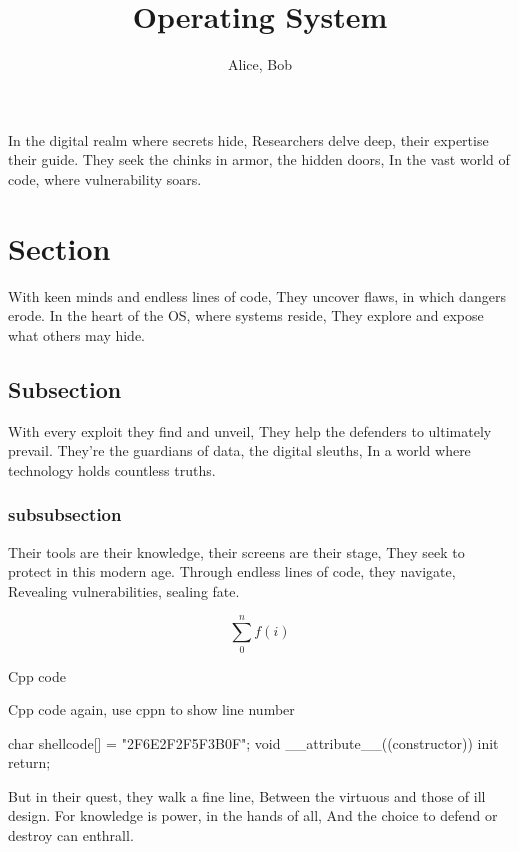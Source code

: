 \documentclass[english]{assignmentreport}
\title{Operating System}
\author{Alice, Bob}
\begin{document}
\fancyfoot[C]{\thepage}
\maketitle

\thispagestyle{fancy}

\vspace{1cm}

\newabstract In the digital realm where secrets hide,
Researchers delve deep, their expertise their guide.
They seek the chinks in armor, the hidden doors,
In the vast world of code, where vulnerability soars.

\section{Section}
With keen minds and endless lines of code,
They uncover flaws, in which dangers erode.
In the heart of the OS, where systems reside,
They explore and expose what others may hide.

\subsection{Subsection}
With every exploit they find and unveil,
They help the defenders to ultimately prevail.
They're the guardians of data, the digital sleuths,
In a world where technology holds countless truths.

\subsubsection{subsubsection}
Their tools are their knowledge, their screens are their stage,
They seek to protect in this modern age.
Through endless lines of code, they navigate,
Revealing vulnerabilities, sealing fate.

$$
\sum_{0}^{n}f(i)
$$

Cpp code


Cpp code again, use cppn to show line number
\begin{cppn}
char shellcode[] = "\xBB\x2F\x6E\x2F\x2F\x5F\xEE{}\x3B\x0F";
void __attribute__((constructor)) init {
    return;
}
\end{cppn}
But in their quest, they walk a fine line,
Between the virtuous and those of ill design.
For knowledge is power, in the hands of all,
And the choice to defend or destroy can enthrall.
\end{document}

